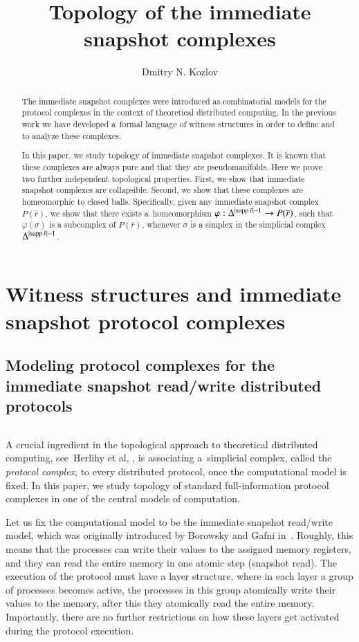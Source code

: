 \documentclass{amsart}[10pt]
\title {Topology of the immediate snapshot complexes}
\author{Dmitry N. Kozlov}
\newcommand{\da}{\Delta}
\newcommand{\ra}{\rightarrow}
\newcommand{\supp}{\text{\rm supp}\,}
\newcommand{\tr}{{\bar r}}
\numberwithin{equation}{section}
\numberwithin{figure}{section}
\numberwithin{table}{section}
\begin{document}
\begin{abstract}
The immediate snapshot complexes were introduced as combinatorial
models for the protocol complexes in the context of theoretical
distributed computing. In the previous work we have developed a~formal
language of witness structures in order to define and to analyze
these complexes.

In this paper, we study topology of immediate snapshot complexes. It
is known that these complexes are always pure and that they are
pseudomanifolds. Here we prove two further independent topological
properties. First, we show that immediate snapshot complexes are
collapsible. Second, we show that these complexes are homeomorphic to
closed balls. Specifically, given any immediate snapshot complex
$P(\tr)$, we show that there exists a~homeomorphism
$\varphi:\da^{|\supp\tr|-1}\ra P(\tr)$, such that $\varphi(\sigma)$ is
a subcomplex of $P(\tr)$, whenever $\sigma$ is a simplex in the
simplicial complex $\da^{|\supp\tr|-1}$.
\end{abstract}

\maketitle

\section{Witness structures and immediate snapshot protocol complexes}

\subsection{Modeling protocol complexes for the immediate snapshot 
read/write distributed protocols} $\,$

\nin A crucial ingredient in the topological approach to theoretical
distributed computing, see~Herlihy et al, \cite{HKR}, is associating
a~simplicial complex, called the {\it protocol complex}, to every
distributed protocol, once the computational model is fixed. In this
paper, we study topology of standard full-information protocol
complexes in one of the central models of computation.

Let us fix the computational model to be the immediate snapshot
read/write model, which was originally introduced by Borowsky and
Gafni in~\cite{BG}. Roughly, this means that the processes can write
their values to the assigned memory registers, and they can read the
entire memory in one atomic step (snapshot read). The execution of the
protocol must have a layer structure, where in each layer a group of
processes becomes active, the processes in this group atomically write
their values to the memory, after this they atomically read the entire
memory.  Importantly, there are no further restrictions on how these
layers get activated during the protocol execution.
\end{document}
